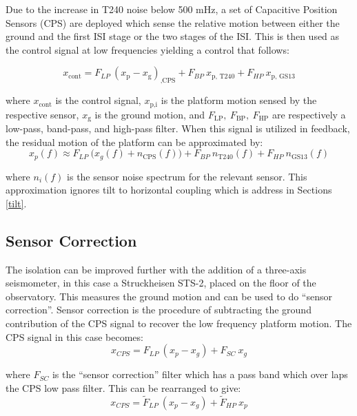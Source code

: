 \documentclass [12pt, proquest]{uwthesis}[2019]
\begin{document}
Due to the increase in T240 noise below 500 mHz, a set of Capacitive Position Sensors (CPS) are deployed which sense the relative motion between either the ground and the first ISI stage or the two stages of the ISI. This is then used as the control signal at low frequencies yielding a control that follows:

\begin{equation}
x_\text{cont}=F_{LP}\ (x_\text{p}-x_\text{g})_\text{,CPS}+F_{BP}\ x_\text{p, T240}+F_{HP}\ x_\text{p, GS13}
\end{equation}

where $x_\text{cont}$ is the control signal, $x_\text{p,i}$ is the platform motion sensed by the respective sensor, $x_\text{g}$ is the ground motion, and $F_\text{LP},\  F_\text{BP},\ F_\text{HP}$ are respectively a low-pass, band-pass, and high-pass filter. When this signal is utilized in feedback, the residual motion of the platform can be approximated by:
\begin{equation}
x_p(f)\approx F_{LP}\ \big(x_g(f)+n_\text{CPS}(f)\big)+F_{BP}\ n_\text{T240}(f)+F_{HP}\ n_\text{GS13}(f)
\end{equation}

where $n_{i}(f)$ is the sensor noise spectrum for the relevant sensor. This approximation ignores tilt to horizontal coupling which is address in Sections \ref{tilt}.

\subsection{Sensor Correction}\label{SensCor}

The isolation can be improved further with the addition of a three-axis seismometer, in this case a Struckheisen STS-2, placed on the floor of the observatory. This measures the ground motion and can be used to do ``sensor correction''. Sensor correction is the procedure of subtracting the ground contribution of the CPS signal to recover the low frequency platform motion. The CPS signal in this case becomes:
\begin{equation}
x_{CPS}=F_{LP}\ (x_p-x_g)+F_{SC}\ x_g
\end{equation}

where $F_{SC}$ is the ``sensor correction'' filter which has a pass band which over laps the CPS low pass filter. This can be rearranged to give:
\begin{equation}
x_{CPS}=\tilde F_{LP}\ (x_p-x_g)+\tilde F_{HP}\ x_p
\end{equation}
\end{document}

